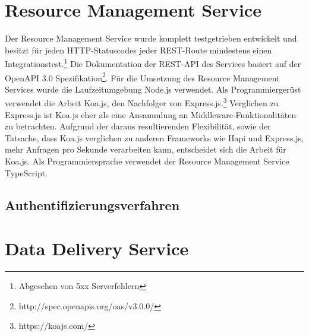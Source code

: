 \section{Resource Management Service}
\label{sec:resourcemanagementservice}
Der Resource Management Service wurde komplett testgetrieben entwickelt und besitzt
für jeden HTTP-Statuscodes jeder REST-Route mindestens einen Integrationstest.\footnote{Abgesehen von 5xx Serverfehlern}
Die Dokumentation der REST-API des Services basiert auf der OpenAPI 3.0
Spezifikation\footnote{http://spec.openapis.org/oas/v3.0.0/}. Für die Umsetzung des Resource Management Services
wurde die Laufzeitumgebung Node.js verwendet. Als Programmiergerüst verwendet die Arbeit Koa.js, den Nachfolger
von Express.js.\footnote{https://koajs.com/} Verglichen zu Express.js ist Koa.js eher als eine Ansammlung
an Middleware-Funktionalitäten zu betrachten\cite[2. Absatz]{ExpressVsKoa}. Aufgrund der daraus resultierenden
Flexibilität, sowie der Tatsache, dass Koa.js verglichen zu anderen Frameworks wie Hapi und Express.js,
mehr Anfragen pro Sekunde verarbeiten kann,\cite{ExpressVsKoaVsHapiPerformance}
entscheidet sich die Arbeit für Koa.js. Als Programmiersprache verwendet der Resource Management Service
TypeScript.



\subsection{Authentifizierungsverfahren}
\label{subsec:authentifizierungsverfahren}

\section{Data Delivery Service}
\label{sec:datadeliveryservice}

